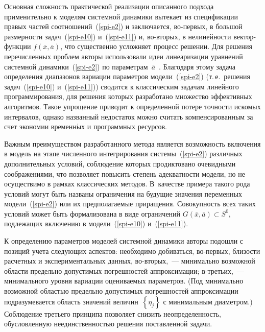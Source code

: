 {\begin{multicols}{2}
  Основная сложность практической реализации описанного подхода
применительно к моделям сис\-тем\-ной динамики вытекает из спецификации
\mbox{правых} частей соотношений~(\ref{spi-e2}) и заключается, во-пер\-вых, в
большой размерности задач~(\ref{spi-e10}) и~(\ref{spi-e11}) и, во-вто\-рых, в
нелинейности век\-тор-функ\-ции $f\left(\bar{x}, \bar{a}\right)$, что существенно
усложняет процесс решении. Для решения перечисленных проблем авторы
использовали идеи линеаризации уравнений системной динамики~(\ref{spi-e2})
по параметрам~$\bar{a}$~\cite{spi-7}. Благодаря этому задача определения
диапазонов вариации па\-ра\-мет\-ров модели~(\ref{spi-e2}) (т.\,е.\ решения
задач~(\ref{spi-e10}) и~(\ref{spi-e11})) сводится к классическим задачам
линейного программирования, для решения которых разработано множество
эффективных алгоритмов. Такое упрощение приводит к определенной потере
точности искомых интервалов, однако названный недостаток можно считать
компенсированным за счет экономии временн$\acute{\mbox{ы}}$х и программных ресурсов.

  Важным преимуществом разработанного метода является возможность
включения в модель на этапе численного интегрирования
  системы~(\ref{spi-e2}) различных дополнительных условий, соблюдение
которых продиктовано очевидными соображениями, что позволяет повысить
степень адекватности модели, но не осуществимо в рамках классических
методов. В~качестве примера такого рода условий могут быть названы
ограничения на будущие значения переменных модели~(\ref{spi-e2}) или их
предполагаемые приращения. Совокупность всех таких условий может быть
формализована в виде ограничений $G\left(\bar{x}, \bar{a}\right) \subset S^0$,
подлежащих включению в модели~(\ref{spi-e10}) и~(\ref{spi-e11}).

  К определению параметров моделей системной динамики авторы подошли с
позиций учета сле\-ду\-ющих аспектов: необходимо добиваться, во-пер\-вых,
близости расчетных и экспериментальных данных, во-вто\-рых,~--- минимально
возможной области предельно допустимых погрешностей аппроксимации;
в-третьих,~--- минимального уровня вариации оцениваемых параметров. (Под
минимально возможной областью предельно допустимых погрешностей
аппроксимации подразумевается область значений
величин~$\left\{\eta_j\right\}$ с минимальным диаметром.) Соблюдение
третьего принципа позволяет снизить неопределенность, обусловленную
не\-един\-ст\-вен\-ностью решения поставленной задачи.


\end{multicols}}
